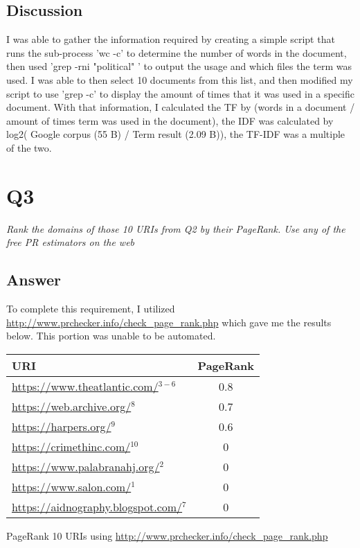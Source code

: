 \documentclass[12pt]{article}
\begin{document}
\subsection*{Discussion}
I was able to gather the information required by creating a simple script that runs the sub-process 'wc -c' to determine the number of words in the document, then used 'grep -rni "political" ' to output the usage and which files the term was used. I was able to then select 10 documents from this list, and then modified my script to use 'grep -c' to display the amount of times that it was used in a specific document. With that information, I calculated the TF by (words in a document / amount of times term was used in the document), the IDF was calculated by log2( Google corpus (55 B) / Term result (2.09 B)), the TF-IDF was a multiple of the two.



\section*{Q3}

\emph{Rank the domains of those 10 URIs from Q2 by their PageRank. Use any of the free PR estimators on the web}

\subsection*{Answer}
To complete this requirement, I utilized \url{http://www.prchecker.info/check_page_rank.php} which gave me the results below. This portion was unable to be automated.



\begin{tabular}{|l|c|}

    \hline
    URI & PageRank \\
    \hline
    \url{https://www.theatlantic.com/}$^{3-6}$ & 0.8 \\
    
    \hline
    \url{https://web.archive.org/}$^{8}$ & 0.7 \\
    
    \hline
    \url{https://harpers.org/}$^{9}$ & 0.6 \\
    
    \hline
    \url{https://crimethinc.com/}$^{10}$ & 0 \\
    
    \hline
    \url{https://www.palabranahj.org/}$^{2}$ & 0 \\
    
    \hline
    \url{https://www.salon.com/}$^{1}$ & 0 \\
    
    \hline
    \url{https://aidnography.blogspot.com/}$^{7}$ & 0 \\
    \hline
\end{tabular}
\caption{PageRank 10 URIs using \url{http://www.prchecker.info/check_page_rank.php}}
\end{document}
